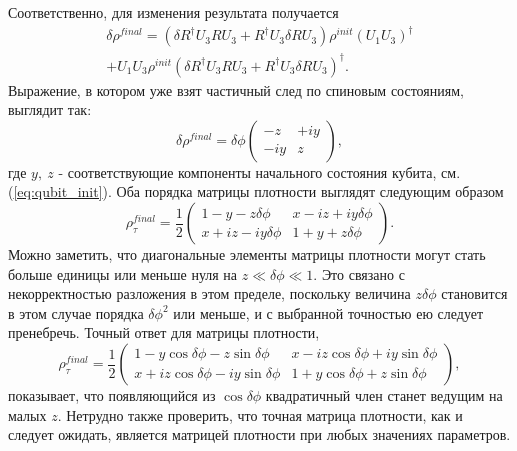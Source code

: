 \documentclass[a4paper,12pt]{article}
\theoremstyle{plain} %
\theoremstyle{definition} %
\theoremstyle{remark} %
\begin{document}
Соответственно, для изменения результата получается
\begin{multline}
    \delta \rho^{final} = \left( \delta R^\dagger U_3 R U_3 + R^\dagger U_3 \delta R U_3 \right) \rho^{init} (U_1 U_3)^\dagger \\
    + U_1 U_3 \rho^{init} \left( \delta R^\dagger U_3 R U_3 + R^\dagger U_3 \delta R U_3 \right)^\dagger.
\end{multline}
Выражение, в котором уже взят частичный след по спиновым состояниям, выглядит так:
\begin{equation}
    \delta \rho^{final} = \delta \phi
    \begin{pmatrix}
        -z & + i y \\
        - i y & z
    \end{pmatrix},
\end{equation}
где $y,\ z$ - соответствующие компоненты начального состояния кубита, см. (\ref{eq:qubit_init}).
Оба порядка матрицы плотности выглядят следующим образом
\begin{equation}
    \rho^{final}_\tau = \frac{1}{2}
    \begin{pmatrix}
        1 - y -  z \delta \phi & x - i z + i y \delta \phi \\
        x + i z - i y \delta \phi & 1 + y +  z \delta \phi
    \end{pmatrix}.
\end{equation}
Можно заметить, что диагональные элементы матрицы плотности могут стать больше единицы или меньше нуля на $z \ll \delta \phi \ll 1$. Это связано с некорректностью разложения в этом пределе, поскольку величина $z \delta \phi$ становится в этом случае порядка $\delta \phi^2$ или меньше, и с выбранной точностью ею следует пренебречь. Точный ответ для матрицы плотности,
\begin{equation}
    \rho^{final}_\tau = \frac{1}{2}
    \begin{pmatrix}
    1 - y \cos \delta \phi - z \sin \delta \phi & x - i z \cos \delta \phi + i y \sin \delta \phi \\
    x + i z \cos \delta \phi - i y \sin \delta \phi & 1 + y \cos \delta \phi + z \sin \delta \phi
    \end{pmatrix},
\end{equation}
показывает, что появляющийся из $\cos \delta \phi$ квадратичный член станет ведущим на малых $z$. Нетрудно также проверить, что точная матрица плотности, как и следует ожидать, является матрицей плотности при любых значениях параметров.
\end{document}

